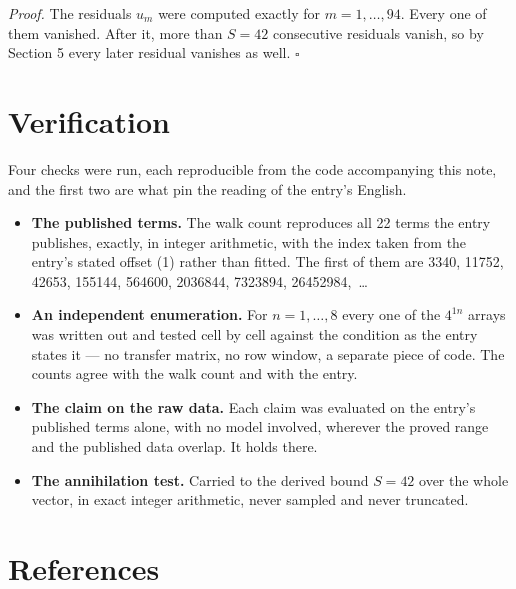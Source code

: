 \documentclass[11pt]{article}
\theoremstyle{definition}
\begin{document}
{\itshape Proof.} The residuals $u_m$ were computed exactly for $m = 1,\dots,94$. Every one of them vanished. After it, more than $S = 42$ consecutive residuals vanish, so by Section 5 every later residual vanishes as well. $\square$

\section{Verification}

Four checks were run, each reproducible from the code accompanying this note, and the first two are what pin the reading of the entry's English.

\begin{itemize}

\item {\bfseries The published terms.} The walk count reproduces all 22 terms the entry publishes, exactly, in integer arithmetic, with the index taken from the entry's stated offset (1) rather than fitted. The first of them are 3340, 11752, 42653, 155144, 564600, 2036844, 7323894, 26452984,~\dots

\item {\bfseries An independent enumeration.} For $n = 1,\dots,8$ every one of the $4^{1n}$ arrays was written out and tested cell by cell against the condition as the entry states it --- no transfer matrix, no row window, a separate piece of code. The counts agree with the walk count and with the entry.

\item {\bfseries The claim on the raw data.} Each claim was evaluated on the entry's published terms alone, with no model involved, wherever the proved range and the published data overlap. It holds there.

\item {\bfseries The annihilation test.} Carried to the derived bound $S = 42$ over the whole vector, in exact integer arithmetic, never sampled and never truncated.

\end{itemize}

\section{References}
\end{document}
